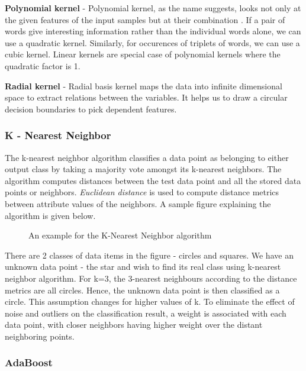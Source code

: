 \documentclass[9pt,twocolumn,twoside]{../../styles/osajnl}
\begin{document}
{\noindent
\textbf{Polynomial kernel} - Polynomial kernel, as the name suggests, looks not
only at the given features of the input samples but at their
combination \cite{www-polykernel-wiki}. If a pair of words give
interesting information rather than the individual words alone, we can
use a quadratic kernel. Similarly, for occurences of triplets of
words, we can use a cubic kernel. Linear kernels are special case of
polynomial kernels where the quadratic factor is 1.\newline

\noindent
\textbf{Radial kernel} - Radial basis kernel maps the data into infinite
dimensional space to extract relations between the variables. It helps
us to draw a circular decision boundaries to pick dependent features.

\subsubsection{K - Nearest Neighbor}
The k-nearest neighbor algorithm classifies a data point as belonging
to either output class by taking a majority vote amongst its k-nearest
neighbors. The algorithm computes distances between the test data
point and all the stored data points or neighbors. \emph{Euclidean
  distance} \cite{www-wiki-euclidean_distance} is used to compute
distance metrics between attribute values of the neighbors. A sample
figure explaining the algorithm is given below.

\begin{figure}[htbp]
\centering
{}
\caption{An example for the K-Nearest Neighbor algorithm \cite{www-knn-introduction}}
\label{fig: An example for the K-Nearest Neighbor algorithm}
\end{figure}

\noindent
There are 2 classes of data items in the figure - circles and
squares. We have an unknown data point - the star and wish to find its
real class using k-nearest neighbor algorithm. For k=3, the 3-nearest
neighbours according to the distance metrics are all circles. Hence,
the unknown data point is then classified as a circle. This assumption
changes for higher values of k. To eliminate the effect of noise and
outliers on the classification result, a weight is associated with
each data point, with closer neighbors having higher weight over the
distant neighboring points.

\subsubsection{AdaBoost}

}
\end{document}
